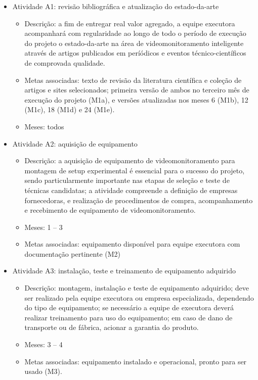 
\begin{itemize}
	\item Atividade A1: revisão bibliográfica e atualização do estado-da-arte
	\begin{itemize}
		\item Descrição: a fim de entregar real valor agregado, a equipe executora acompanhará com regularidade ao longo de todo o período de execução do projeto o estado-da-arte na área de videomonitoramento inteligente através de artigos publicados em períódicos e eventos técnico-científicos de comprovada qualidade.
		\item Metas associadas: texto de revisão da literatura científica e coleção de artigos e sites selecionados; primeira versão de ambos no terceiro mês de execução do projeto (M1a), e versões atualizadas nos meses 6 (M1b), 12 (M1c), 18 (M1d) e 24 (M1e).
		\item Meses: todos
	\end{itemize}
	\item Atividade A2: aquisição de equipamento
	\begin{itemize}
		\item Descrição: a aquisição de equipamento de videomonitoramento para montagem de setup experimental é essencial para o sucesso do projeto, sendo particularmente importante nas etapas de seleção e teste de técnicas candidatas; a atividade compreende a definição de empresas fornecedoras, e realização de procedimentos de compra, acompanhamento e recebimento de equipamento de videomonitoramento. 
		\item Meses: 1 -- 3
		\item Metas associadas: equipamento disponível para equipe executora com documentação pertinente (M2)
	\end{itemize}
	\item Atividade A3: instalação, teste e treinamento de equipamento adquirido
	\begin{itemize}
		\item Descrição: montagem, instalação e teste de equipamento adquirido; deve ser realizado pela equipe executora ou empresa especializada, dependendo do tipo de equipamento; se necessário a equipe de executora deverá realizar treinamento para uso do equipamento; em caso de dano de transporte ou de fábrica, acionar a garantia do produto.
		\item Meses: 3 -- 4
		\item Metas associadas: equipamento instalado e operacional, pronto para ser usado (M3).

\end{itemize}
\end{itemize}
